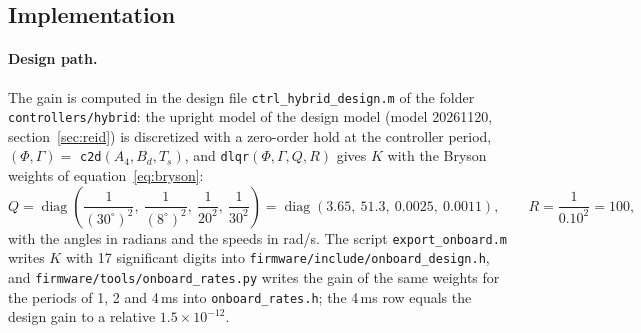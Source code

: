 \documentclass[a4paper,11pt]{article}
\begin{document}
\subsection{Implementation}
\label{sec:lqr_impl}
\paragraph{Design path.} The gain is computed in the design file \texttt{ctrl\_hybrid\_design.m} of the folder \texttt{controllers/hybrid}: the upright model of the design model (model 20261120, section~\ref{sec:reid}) is discretized with a zero-order hold at the controller period, $(\Phi, \Gamma) = $ \texttt{c2d}$(A_4, B_d, T_s)$, and \texttt{dlqr}$(\Phi, \Gamma, Q, R)$ gives $K$ with the Bryson weights of equation~\ref{eq:bryson}:
\begin{equation}
  Q = \operatorname{diag}\!\left(\frac{1}{(30^\circ)^2},\ \frac{1}{(8^\circ)^2},\ \frac{1}{20^2},\ \frac{1}{30^2}\right) = \operatorname{diag}(3.65,\ 51.3,\ 0.0025,\ 0.0011), \qquad R = \frac{1}{0.10^2} = 100,
  \label{eq:lqr_impl_Q}
\end{equation}
with the angles in radians and the speeds in rad/s. The script \texttt{export\_onboard.m} writes $K$ with 17 significant digits into \nolinkurl{firmware/include/onboard_design.h}, and \nolinkurl{firmware/tools/onboard_rates.py} writes the gain of the same weights for the periods of 1, 2 and 4\,ms into \nolinkurl{onboard_rates.h}; the 4\,ms row equals the design gain to a relative $1.5\times10^{-12}$.
\end{document}
